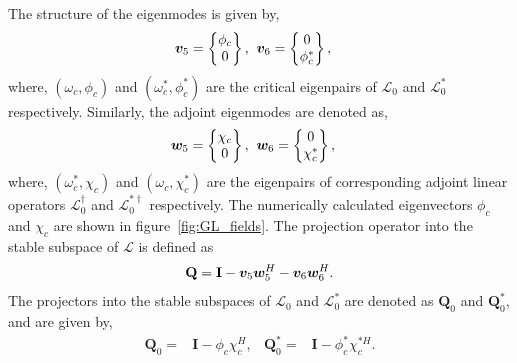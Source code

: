 The structure of the eigenmodes is given by,
 \begin{align}
	\boldsymbol{v}_{5} = \begin{Bmatrix}
		\phi_{c} \\
		0 
	\end{Bmatrix}, & \hspace{2mm}
	\boldsymbol{v}_{6} = \begin{Bmatrix}
		0 \\
		\phi^{*}_{c} 
	\end{Bmatrix}, \nonumber
\end{align}
where, $(\omega_{c},\phi_{c})$ and $(\omega^{*}_{c},\phi^{*}_{c})$ are the critical eigenpairs of $\mathcal{L}_{0}$ and $\mathcal{L}^{*}_{0}$ respectively. Similarly, the adjoint eigenmodes are denoted as,
\begin{align}
	\boldsymbol{w}_{5} = \begin{Bmatrix}
		\chi_{c} \\
		0 
	\end{Bmatrix}, & \hspace{2mm}
	\boldsymbol{w}_{6} = \begin{Bmatrix}
		0 \\
		\chi^{*}_{c} 
	\end{Bmatrix}, \nonumber
\end{align}
where, $(\omega^{*}_{c},\chi_{c})$ and $(\omega_{c},\chi^{*}_{c})$ are the eigenpairs of corresponding adjoint linear operators $\mathcal{L}^{\dagger}_{0}$ and $\mathcal{L}^{*\dagger}_{0}$ respectively. The numerically calculated eigenvectors $\phi_{c}$ and $\chi_{c}$ are shown in figure~\ref{fig:GL_fields}. The projection operator into the stable subspace of $\mathcal{L}$ is defined as
\begin{align}
	\mathbf{Q} = \mathbf{I} - \boldsymbol{v}_{5}\boldsymbol{w}_{5}^{H} - \boldsymbol{v}_{6}\boldsymbol{w}_{6}^{H}. \nonumber
\end{align}
The projectors into the stable subspaces of $\mathcal{L}_{0}$ and $\mathcal{L}^{*}_{0}$ are denoted as $\mathbf{Q}_{0}$ and $\mathbf{Q}^{*}_{0}$, and are given by,
\begin{align}
	\mathbf{Q}_{0} 			=& \mathbf{I} - \phi_{c}\chi^{H}_{c}, & 
	\mathbf{Q}^{*}_{0} 	=& \mathbf{I} - \phi^{*}_{c}\chi^{*H}_{c}. \nonumber
\end{align}

